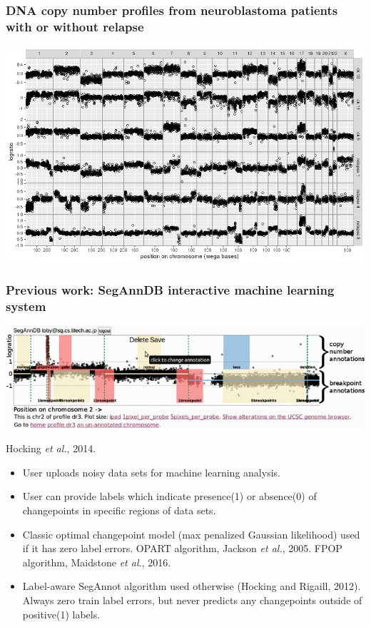 \documentclass{beamer}
\begin{document}
\begin{frame}
  \frametitle{DNA copy number profiles from neuroblastoma patients with or without relapse}

  \hspace*{-1cm}
  \includegraphics[width=1.15\textwidth]{figure-neuroblastoma-clinical}
  
\end{frame}

\begin{frame}
  \frametitle{Previous work: SegAnnDB interactive machine learning
    system}

  \includegraphics[width=\textwidth]{screenshot-SegAnnDB-figure-1}

  Hocking \emph{et al.}, 2014. 

  \begin{itemize}
  \item User uploads noisy data sets for machine learning analysis.
  \item User can provide labels which indicate presence(1) or
    absence(0) of changepoints in specific regions of data sets.
  \item Classic optimal changepoint model (max penalized Gaussian
    likelihood) used if it has zero label errors. OPART algorithm,
    Jackson \emph{et al.}, 2005. FPOP algorithm, Maidstone \emph{et
      al.}, 2016. 
  \item Label-aware SegAnnot algorithm used otherwise (Hocking and
    Rigaill, 2012). Always zero train label errors, but never predicts
    any changepoints outside of positive(1) labels.
  \end{itemize}
  
\end{frame}
\end{document}

